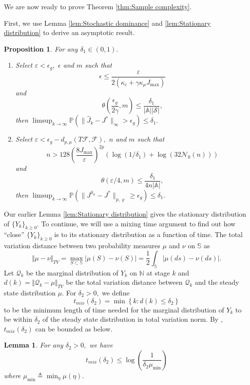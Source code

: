 \documentclass[12pt,technote,onecolumn]{IEEEtran}
\newtheorem{lemma}{Lemma}
\newtheorem{proposition}{Proposition}
\begin{document}
We are now ready to prove Theorem \ref{thm:Sample complexity}.
\begin{IEEEproof}
	
	
	First, we use Lemma \ref{lem:Stochastic dominance} and \ref{lem:Stationary distribution}
	to derive an asymptotic result.
	\begin{proposition}
		\label{prop:Asymptotic bound} For any $\delta_{1}\in\left(0,1\right).$
		\begin{enumerate}
			\item Select $\varepsilon<\epsilon_{g},$ $\epsilon$ and $m$ such
			that			
			\[
			\epsilon\leq\frac{\varepsilon}{2\left(\kappa_{c}+\gamma\kappa_{\mu}J_{\max}\right)}
			\]
			and 			
			\[
			\theta\left(\frac{\epsilon_{g}}{2\gamma},m\right)\leq\frac{\delta_{1}}{\left|\mathbb{A}\right|\left|\mathcal{S}\right|},
			\]
			then $\limsup_{k\rightarrow\infty}\mathbb{P}(\|\widehat{J}_{k}-J^{*}\|_{\infty}>\epsilon_{g})\leq\delta_{1}.$
			\item Select $\varepsilon<\epsilon_{g}-d_{p,\mu}\left(T\mathcal{F},\mathcal{F}\right),$
			$n$ and $m$ such that 			
			\[
			n>128\left(\frac{8J_{\max}}{\varepsilon}\right)^{2p}\left(\log\left(1/\delta_{1}\right)+\log\left(32\mathcal{N}_{0}\left(n\right)\right)\right)
			\]
			and			
			\[
			\theta\left(\varepsilon/4,m\right)\leq\frac{\delta_{1}}{4n\left|\mathbb{A}\right|},
			\]
			then $\limsup_{k\rightarrow\infty}\mathbb{P}(\|J^{\widehat{\pi}_{k}}-J^{*}\|_{p,\varrho}\geq\epsilon_{g})\leq\delta_{1}.$
		\end{enumerate}
	\end{proposition}
	
	Our earlier Lemma \ref{lem:Stationary distribution} gives the stationary
	distribution of $\{ Y_{k}\} _{k\geq0}$. To continue, we
	will use a mixing time argument to find out how ``close'' $\{ Y_{k}\} _{k\geq0}$
	is to its stationary distribution as a function of time. The total
	variation distance between two probability measures $\mu$ and $\nu$
	on $\mathbb{S}$ as 
	\[
	\bigl\Vert\mu-\nu\bigr\Vert_{TV}=\max_{S\subset\mathbb{S}}\bigl|\mu\left(S\right)-\nu\left(S\right)\bigr|=\frac{1}{2}\int_{\mathbb{S}}\bigl|\mu\left(ds\right)-\nu\left(ds\right)\bigr|.
	\]
	Let $\mathcal{Q}_{k}$ be the marginal distribution of $Y_{k}$ on
	$\mathbb{N}$ at stage $k$ and $d\left(k\right)=\Vert\mathcal{Q}_{k}-\mu\Vert_{TV}$
	be the total variation distance between $\mathcal{Q}_{k}$ and the
	steady state distribution $\mu.$ For $\delta_{2}>0,$ we define 	
	\[
	t_{mix}\left(\delta_{2}\right)=\min\left\{ k:d\left(k\right)\leq\delta_{2}\right\} 
	\]
	to be the minimum length of time needed for the marginal distribution
	of $Y_{k}$ to be within $\delta_{2}$ of the steady state distribution
	in total variation norm. By \cite[Theorem 12.3]{levin2009markov},
	$t_{mix}\left(\delta_{2}\right)$ can be bounded as below.
	\begin{lemma}
		\label{lem:Mixing time} For any $\delta_{2}>0,$	we have	
		$$
		t_{mix}\left(\delta_{2}\right)\leq\log\left(\frac{1}{\delta_{2}\mu_{\min}}\right)
		$$
		where $\mu_{\min}\triangleq\min_{\eta}\mu\left(\eta\right).$
	\end{lemma}
	

\end{IEEEproof}
\end{document}
